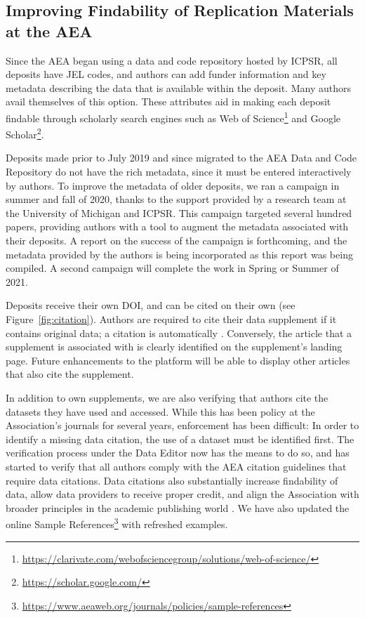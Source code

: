 \documentclass[PP]{AEA}
\newcommand{\urlcite}[2]{#2\footnote{\url{#1}}}
\begin{document}
\subsection{Improving Findability of Replication Materials at the AEA}
\label{sec:findability}

Since the AEA began using a data and code repository hosted by \ac{ICPSR}, all deposits have JEL codes, and authors can add funder information and key metadata describing the data that is available within the deposit. Many authors avail themselves of this option. These attributes aid in making each deposit  findable through scholarly search engines such as \urlcite{https://clarivate.com/webofsciencegroup/solutions/web-of-science/}{Web of Science} and \urlcite{https://scholar.google.com/}{Google Scholar}. 

Deposits made prior to July 2019 and since migrated to the AEA Data and Code Repository do not have the rich metadata, since it must be entered interactively by authors. To improve the metadata of older deposits, we ran a campaign in summer and fall of 2020, thanks to the support provided by a research team at the University of Michigan and ICPSR. This campaign targeted several hundred papers, providing authors with a tool to augment the metadata associated with their deposits. A report on the success of the campaign is forthcoming, and the metadata provided by the authors is being incorporated as this report was being compiled. A second campaign will complete the work in Spring or Summer of 2021. 

Deposits receive their own \ac{DOI}, and can be cited on their own (see Figure~\ref{fig:citation}). Authors are required to cite their data supplement if it contains original data; a citation is automatically . Conversely, the article that a supplement is associated with is clearly identified on the supplement's landing page. Future enhancements to the platform will be able to display other articles that also cite the supplement. 




In addition to own supplements, we are also verifying that authors cite the datasets they have used and accessed. While this has been policy at the Association's journals for several years, enforcement has been difficult: In order to identify a missing data citation, the use of a dataset must be identified first. The verification process under the Data Editor now has the means to do so, and has started to verify that all authors comply with the AEA citation guidelines that require data citations. Data citations also substantially increase findability of data, allow data providers to receive proper credit, and align the Association with broader principles in the academic publishing world \citep{Altman2013-fl,dataone-cite,jddcp,CousijnSci.Data2018}. We have also updated the online  \urlcite{https://www.aeaweb.org/journals/policies/sample-references}{Sample References} with refreshed examples.
\end{document}
